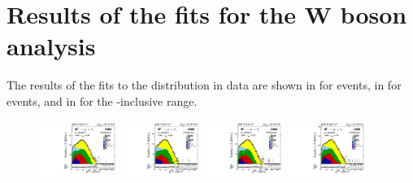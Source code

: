 \chapter{Results of the fits for the W boson analysis}\label{app:WBoson_SignalExtraction_Fits}

The results of the fits to the \ptmiss distribution in data are shown in  for \WToMuNuMi events, in  for \WToMuNuPl events, and in  for the \etaMuCM-inclusive range.

\begin{figure}[htb!]
\centering
\begin{tiny}
\includegraphics[width=0.23\textwidth]{Figures/WBoson/Analysis/SignalExtraction/Signal/LOG/PLOT_MET_DATA_WToMuMi_PA_Model_TEMP_WDYDYToTauWToTauTTbar_ModifiedRayleigh_QCD_MuEtaCM_-286_-260_MuIso_0_15.pdf}
\includegraphics[width=0.23\textwidth]{Figures/WBoson/Analysis/SignalExtraction/Signal/LOG/PLOT_MET_DATA_WToMuMi_PA_Model_TEMP_WDYDYToTauWToTauTTbar_ModifiedRayleigh_QCD_MuEtaCM_-260_-240_MuIso_0_15.pdf}
\includegraphics[width=0.23\textwidth]{Figures/WBoson/Analysis/SignalExtraction/Signal/LOG/PLOT_MET_DATA_WToMuMi_PA_Model_TEMP_WDYDYToTauWToTauTTbar_ModifiedRayleigh_QCD_MuEtaCM_-240_-220_MuIso_0_15.pdf}
\includegraphics[width=0.23\textwidth]{Figures/WBoson/Analysis/SignalExtraction/Signal/LOG/PLOT_MET_DATA_WToMuMi_PA_Model_TEMP_WDYDYToTauWToTauTTbar_ModifiedRayleigh_QCD_MuEtaCM_-220_-193_MuIso_0_15.pdf}
\\

\end{tiny}
\end{figure}
